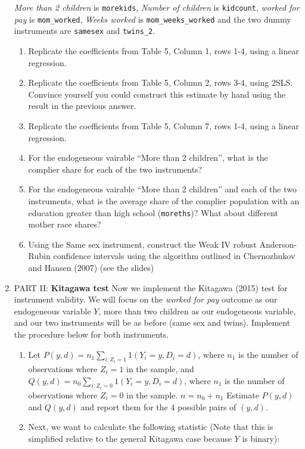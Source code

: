 \documentclass[11pt, a4paper]{article}
\begin{document}
\begin{enumerate}
  \textit{More than 2 children} is \texttt{morekids}, \textit{Number
    of children} is \texttt{kidcount}, \textit{worked for pay} is
  \texttt{mom\_worked}, \textit{Weeks worked} is
  \texttt{mom\_weeks\_worked} and the two dummy instruments are
  \texttt{samesex} and \texttt{twins\_2}.
  \begin{enumerate}
  \item Replicate the coefficients from Table 5, Column 1, rows 1-4, using a linear regression.
  \item Replicate the coefficients from Table 5, Column 2, rows 3-4,
    using 2SLS. Convince yourself you could construct this estimate by
    hand using the result in the previous answer.
  \item Replicate the coefficients from Table 5, Column 7, rows 1-4, using a linear regression.
  \item For the endogeneous vairable ``More than 2 children'', what is
    the complier share for each of the two instruments?
  \item For the endogeneous vairable ``More than 2 children'' and each
    of the two instruments, what is the average share of the complier
    population with an education greater than high school
    (\texttt{moreths})? What about different mother race shares?
  \item Using the Same sex instrument, construct the Weak IV robust
    Anderson-Rubin confidence intervals using the algorithm outlined
    in Chernozhukov and Hansen (2007) (see the slides)
  \end{enumerate}
\item PART II: \textbf{Kitagawa test} Now we implement the Kitagawa
  (2015) test for instrument validity. We will focus on the
  \textit{worked for pay} outcome as our endogeneous variable $Y$,
  more than two children as our endogeneous variable, and our two
  instruments will be as before (same sex and twins). Implement the procedure below for both instruments.
  \begin{enumerate}
  \item Let
    $P(y,d) = n_{1} \sum_{i : Z_{i} = 1} 1(Y_{i} = y, D_{i} = d)$,
    where $n_{1}$ is the number of observations where $Z_{i} = 1$ in
    the sample, and
    $Q(y,d) = n_{0} \sum_{i : Z_{i} = 0} 1(Y_{i} = y, D_{i} = d)$,
    where $n_{1}$ is the number of observations where $Z_{i} = 0$ in
    the sample. $n = n_{0} + n_{1}$ Estimate $P(y,d)$ and $Q(y,d)$ and
    report them for the 4 possible pairs of $(y,d)$.
  \item Next, we want to calculate the following statistic (Note that this is simplified relative to the general Kitagawa case because $Y$ is binary):

\end{enumerate}
\end{enumerate}
\end{document}
